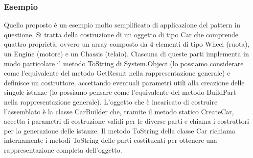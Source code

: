 \documentclass[a4paper,10pt]{article}
\begin{document}
                \subsubsection{Esempio}
                Quello proposto è un esempio molto semplificato di applicazione del pattern in questione. Si tratta della costruzione di un oggetto di tipo Car che comprende quattro proprietà, ovvero un array composto da 4 elementi di tipo Wheel (ruota), un Engine (motore) e un Chassis (telaio). Ciascuna di queste parti implementa in modo particolare il metodo ToString di System.Object (lo possiamo considerare come l’equivalente del metodo GetResult nella rappresentazione generale) e definisce un costruttore, accettando eventuali parametri utili alla creazione delle singole istanze (lo possiamo pensare come l’equivalente del metodo BuildPart nella rappresentazione generale). L’oggetto che è incaricato di costruire l’assemblato è la classe CarBuilder che, tramite il metodo statico CreateCar, accetta i parametri di costruzione validi per le diverse parti e chiama i costruttori per la generazione delle istanze. Il metodo ToString della classe Car richiama internamente i metodi ToString delle parti costituenti per ottenere una rappresentazione completa dell’oggetto. 
\end{document}
